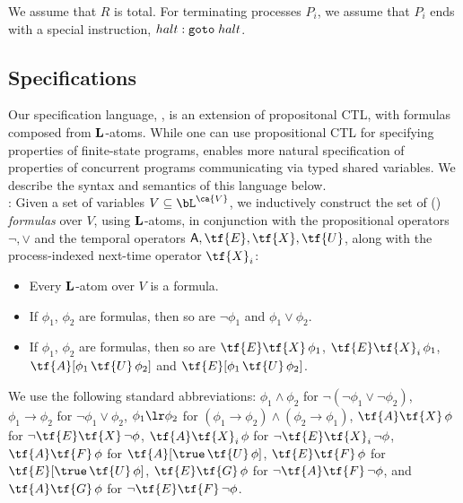 \noindent We assume that $R$ is total. For terminating processes
$P_i$, we assume that $P_i$ ends with a special instruction,
$halt: {\tt goto} \; halt$.  

\subsection{Specifications}\label{sec:spec}

Our specification language, \vCTL, is an extension of propositonal
CTL, with formulas composed from ${\bf L}$-atoms.  While one can use
propositional CTL for specifying properties of finite-state programs,
\vCTL enables more natural specification of properties of concurrent
programs communicating via typed shared variables.  We describe the
syntax and semantics of this language below.  \\

: 
Given a set of variables $V \subseteq
\bL^{\ca{V}}$, we inductively construct the set of (\vCTL) {\em formulas}
over $V$, using ${\bf L}$-atoms, in conjunction with the
propositional operators $\neg, \vee$ and the temporal operators
$\textsf{A},\tf{E},\tf{X},\tf{U}$,
along with the process-indexed next-time operator $\tf{X}_i$:

\begin{itemize}
\item Every ${\bf L}$-atom over $V$ is a formula. 
\item If $\phi_1$, $\phi_2$ are formulas, then so are $\neg \phi_1$
and $\phi_1 \vee \phi_2$. 
\item If $\phi_1$, $\phi_2$ are formulas, then so are $\tf{E}\tf{X} \, \phi_1$,
$\tf{E}\tf{X}_i \, \phi_1$, $\tf{A}[\phi_1 \, \tf{U} \, \phi_2]$ and
$\tf{E}[\phi_1 \, \tf{U} \, \phi_2]$.
\end{itemize}

We use the following standard abbreviations: $\phi_1 \wedge \phi_2$
for $\neg(\neg \phi_1 \vee \neg \phi_2)$, $\phi_1 \to \phi_2$ for
$\neg \phi_1 \vee \phi_2$, $\phi_1 \lr \phi_2$ for $(\phi_1 \to
\phi_2) \wedge (\phi_2 \to \phi_1)$, $\tf{A}\tf{X} \, \phi$ for $\neg
\tf{E}\tf{X} \, \neg
\phi$, $\tf{A}\tf{X}_i \, \phi$ for $\neg \tf{E}\tf{X}_i \, \neg \phi$,
$\tf{A}\tf{F} \, \phi$ for
$\tf{A}[\true \, \tf{U} \, \phi]$, $\tf{E}\tf{F} \, \phi$ for $\tf{E}[\true
\, \tf{U} \, \phi]$, $\tf{E}\tf{G}
\, \phi$ for $\neg \tf{A}\tf{F} \, \neg \phi$, and  $\tf{A}\tf{G} \, \phi$
for $\neg \tf{E}\tf{F} \,
\neg \phi$.\\

